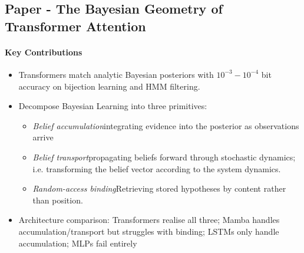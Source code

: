 \documentclass[12pt,a4paper,twoside]{article}
\begin{document}
\subsection{Paper - The Bayesian Geometry of Transformer Attention}
\begin{paper}[
		papertitle = {The Bayesian Geometry of Transformer Attention~\cite{Agarwal2026}},
		authors = {Agarwal et al.},
		summary = {
				Uses \textit{Bayesian wind tunnels} (controlled prediction tasks with closed-form posteriors where the hypothesis space is too large for memorisation and in-context prediction requires genuine probabilistic inference) to empirically prove transformers perform exact Bayesian inference and understand how.
			}
	]
	\tcblower
	\paragraph{Key Contributions}
	\begin{itemize}
		\item Transformers match analytic Bayesian posteriors with $10^{-3}-10^{-4}$ bit accuracy on bijection learning and HMM filtering.
		\item Decompose Bayesian Learning into three primitives:
		      \begin{itemize}
			      \item \textit{Belief accumulation}\quad integrating evidence into the posterior as observations arrive
			      \item \textit{Belief transport}\quad propagating beliefs forward through stochastic dynamics; i.e. transforming the belief vector according to the system dynamics.
			      \item \textit{Random-access binding}\quad Retrieving stored hypotheses by content rather than position.
		      \end{itemize}
		\item Architecture comparison: Transformers realise all three; Mamba handles accumulation/transport but struggles with binding; LSTMs only handle accumulation; MLPs fail entirely
	\end{itemize}


\end{paper}
\end{document}
